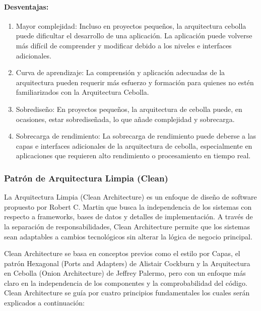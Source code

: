 \paragraph{Desventajas:}
\begin{enumerate}
    \item Mayor complejidad: Incluso en proyectos pequeños, la arquitectura cebolla puede dificultar el desarrollo de una aplicación. La aplicación puede volverse más difícil de comprender y modificar debido a los niveles e interfaces adicionales.
    \item Curva de aprendizaje: La comprensión y aplicación adecuadas de la arquitectura pueden requerir más esfuerzo y formación para quienes no estén familiarizados con la Arquitectura Cebolla.
    \item Sobrediseño: En proyectos pequeños, la arquitectura de cebolla puede, en ocasiones, estar sobrediseñada, lo que añade complejidad y sobrecarga.
    \item Sobrecarga de rendimiento: La sobrecarga de rendimiento puede deberse a las capas e interfaces adicionales de la arquitectura de cebolla, especialmente en aplicaciones que requieren alto rendimiento o procesamiento en tiempo real.
\end{enumerate}

\subsubsection{Patrón de Arquitectura Limpia (Clean)}
La Arquitectura Limpia (Clean Architecture) es un enfoque de dise\~no de software propuesto
por Robert C. Martin que busca la independencia de los sistemas con respecto a frameworks,
bases de datos y detalles de implementaci\'on\cite{cleanArchitecture}. A través de la separación 
de responsabilidades, Clean Architecture permite que los sistemas sean adaptables a 
cambios tecnológicos sin alterar la lógica de negocio principal. 

Clean Architecture se basa en conceptos previos como el estilo por Capas, 
el patr\'on Hexagonal (Ports and Adapters) de Alistair Cockburn y la Arquitectura en 
Cebolla (Onion Architecture) de Jeffrey Palermo, pero con un enfoque más claro en la 
independencia de los componentes y la comprobabilidad del código. Clean Architecture
se gu\'ia por cuatro principios fundamentales\cite{cleanArchitecturePrincipios} los cuales
ser\'an explicados a continuaci\'on:

